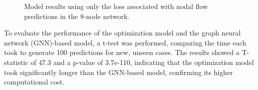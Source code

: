 %
%

%

\begin{figure}
    \centering
    \setlength{}        
    \setlength{} 
    
    \caption{Model results using only the loss associated with nodal flow predictions in the 8-node network.}
    \label{fig:dummy_base_results}
\end{figure}



To evaluate the performance of the optimization model and the graph neural network (GNN)-based model, a t-test was performed, comparing the time each took to generate 100 predictions for new, unseen cases. The results showed a T-statistic of 47.3 and a p-value of 3.7e-110, indicating that the optimization model took significantly longer than the GNN-based model, confirming its higher computational cost.


